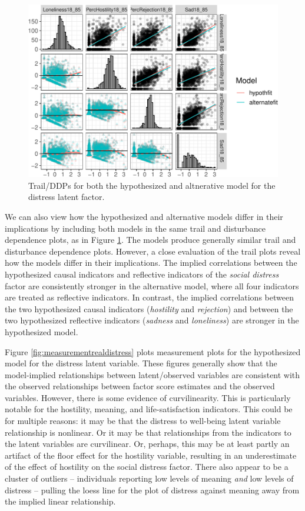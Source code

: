 \documentclass[
  english,
  man]{apa6}
\begin{document}
\begin{figure}
\centering
\includegraphics{flexplavaan_draft_files/figure-latex/tralboth-1.pdf}
\caption{\label{fig:tralboth}Trail/DDPs for both the hypothesized and altnerative model for the distress latent factor.}
\end{figure}

We can also view how the hypothesized and alternative models differ in their implications by including both models in the same trail and disturbance dependence plots, as in Figure \ref{fig:tralboth}. The models produce generally similar trail and disturbance dependence plots. However, a close evaluation of the trail plots reveal how the models differ in their implications. The implied correlations between the hypothesized causal indicators and reflective indicators of the \emph{social distress} factor are consistently stronger in the alternative model, where all four indicators are treated as reflective indicators. In contrast, the implied correlations between the two hypothesized causal indicators (\emph{hostility} and \emph{rejection}) and between the two hypothesized reflective indicators (\emph{sadness} and \emph{loneliness}) are stronger in the hypothesized model.

Figure \ref{fig:measurementrealdistress} plots measurement plots for the hypothesized model for the distress latent variable. These figures generally show that the model-implied relationships between latent/observed variables are consistent with the observed relationships between factor score estimates and the observed variables. However, there is some evidence of curvilinearity. This is particularly notable for the hostility, meaning, and life-satisfaction indicators. This could be for multiple reasons: it may be that the distress to well-being latent variable relationship is nonlinear. Or it may be that relationships from the indicators to the latent variables are curvilinear. Or, perhaps, this may be at least partly an artifact of the floor effect for the hostility variable, resulting in an underestimate of the effect of hostility on the social distress factor. There also appear to be a cluster of outliers -- individuals reporting low levels of meaning \emph{and} low levels of distress -- pulling the loess line for the plot of distress against meaning away from the implied linear relationship.
\end{document}
